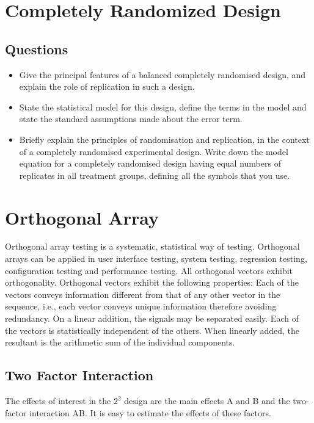 \section{Completely Randomized Design}

\subsection{Questions}
\begin{itemize}
	\item Give the principal features of a  balanced completely randomised design, and
	explain the role of replication in such a design.  \item State the statistical model for
	this design, define the terms in the model and state the standard assumptions
	made about the error term.
	\item Briefly explain the principles of randomisation and replication, in the
	context of a completely randomised experimental design. Write down the model equation for a completely randomised design
	having equal numbers of replicates in all treatment groups, defining all
	the symbols that you use.
\end{itemize}
\section{Orthogonal Array}
Orthogonal array testing is a systematic, statistical way of testing. Orthogonal arrays can be applied in user interface testing, system testing, regression testing, configuration testing and performance testing.
All orthogonal vectors exhibit orthogonality. Orthogonal vectors exhibit the following properties:
Each of the vectors conveys information different from that of any other vector in the sequence, i.e., each vector conveys unique information therefore avoiding redundancy.
On a linear addition, the signals may be separated easily.
Each of the vectors is statistically independent of the others.
When linearly added, the resultant is the arithmetic sum of the individual components.


\subsection{Two Factor Interaction}
The effects of interest in the $2^2$ design are the  main effects A and B and the two-factor interaction AB. It is easy to estimate the effects of these factors.

